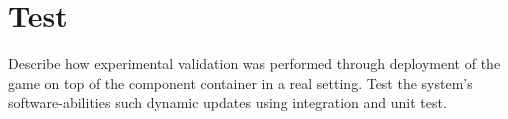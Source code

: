 \section{Test}
Describe how experimental validation was performed through deployment of the game on top of the component container in a real setting.
Test the system's software-abilities such dynamic updates using integration and unit test.
